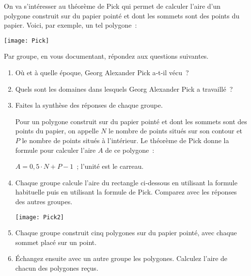 
\begin{TP}

On va s'intéresser au théorème de Pick qui permet de calculer l'aire d'un polygone construit sur du papier pointé et dont les sommets sont des points du papier. Voici, par exemple, un tel polygone :
\begin{center} \texttt{[image: Pick]} \end{center}

Par groupe, en vous documentant, répondez aux questions suivantes.
\begin{enumerate}
 \item Où et à quelle époque, Georg Alexander Pick a‑t‑il vécu ?
 \item Quels sont les domaines dans lesquels Georg Alexander Pick a travaillé ?
 \item Faites la synthèse des réponses de chaque groupe.


Pour un polygone construit sur du papier pointé et dont les sommets sont des points du papier, on appelle $N$ le nombre de points situés sur son contour et $P$ le nombre de points situés à l'intérieur. Le théorème de Pick donne la formule pour calculer l'aire $A$ de ce polygone :
\begin{center} $A = 0,5 \cdot N + P - 1$ ; l'unité est le carreau. \end{center}
\vspace{0.5cm}
 \item Chaque groupe calcule l'aire du rectangle ci‑dessous en utilisant la formule habituelle puis en utilisant la formule de Pick. Comparez avec les réponses des autres groupes. \\[1em]
\begin{center} \texttt{[image: Pick2]} \end{center}

 \item Chaque groupe construit cinq polygones sur du papier pointé, avec chaque sommet placé sur un point.
 \item Échangez ensuite avec un autre groupe les polygones. Calculez l'aire de chacun des polygones reçus.
 \end{enumerate}
\end{TP}

